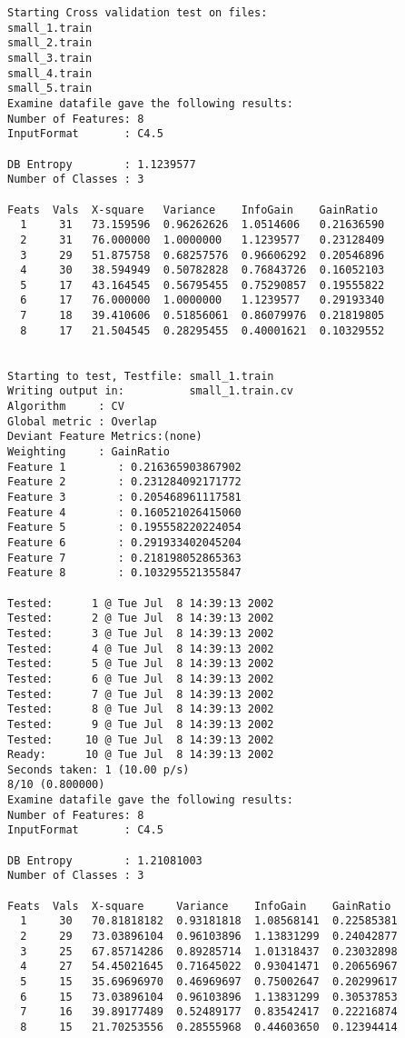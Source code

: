 \begin{verbatim}
Starting Cross validation test on files:
small_1.train
small_2.train
small_3.train
small_4.train
small_5.train
Examine datafile gave the following results:
Number of Features: 8
InputFormat       : C4.5

DB Entropy        : 1.1239577
Number of Classes : 3

Feats  Vals  X-square   Variance    InfoGain    GainRatio
  1     31   73.159596  0.96262626  1.0514606   0.21636590
  2     31   76.000000  1.0000000   1.1239577   0.23128409
  3     29   51.875758  0.68257576  0.96606292  0.20546896
  4     30   38.594949  0.50782828  0.76843726  0.16052103
  5     17   43.164545  0.56795455  0.75290857  0.19555822
  6     17   76.000000  1.0000000   1.1239577   0.29193340
  7     18   39.410606  0.51856061  0.86079976  0.21819805
  8     17   21.504545  0.28295455  0.40001621  0.10329552


Starting to test, Testfile: small_1.train
Writing output in:          small_1.train.cv
Algorithm     : CV
Global metric : Overlap
Deviant Feature Metrics:(none)
Weighting     : GainRatio
Feature 1        : 0.216365903867902
Feature 2        : 0.231284092171772
Feature 3        : 0.205468961117581
Feature 4        : 0.160521026415060
Feature 5        : 0.195558220224054
Feature 6        : 0.291933402045204
Feature 7        : 0.218198052865363
Feature 8        : 0.103295521355847

Tested:      1 @ Tue Jul  8 14:39:13 2002
Tested:      2 @ Tue Jul  8 14:39:13 2002
Tested:      3 @ Tue Jul  8 14:39:13 2002
Tested:      4 @ Tue Jul  8 14:39:13 2002
Tested:      5 @ Tue Jul  8 14:39:13 2002
Tested:      6 @ Tue Jul  8 14:39:13 2002
Tested:      7 @ Tue Jul  8 14:39:13 2002
Tested:      8 @ Tue Jul  8 14:39:13 2002
Tested:      9 @ Tue Jul  8 14:39:13 2002
Tested:     10 @ Tue Jul  8 14:39:13 2002
Ready:      10 @ Tue Jul  8 14:39:13 2002
Seconds taken: 1 (10.00 p/s)
8/10 (0.800000)
Examine datafile gave the following results:
Number of Features: 8
InputFormat       : C4.5

DB Entropy        : 1.21081003
Number of Classes : 3

Feats  Vals  X-square     Variance    InfoGain    GainRatio
  1     30   70.81818182  0.93181818  1.08568141  0.22585381
  2     29   73.03896104  0.96103896  1.13831299  0.24042877
  3     25   67.85714286  0.89285714  1.01318437  0.23032898
  4     27   54.45021645  0.71645022  0.93041471  0.20656967
  5     15   35.69696970  0.46969697  0.75002647  0.20299617
  6     15   73.03896104  0.96103896  1.13831299  0.30537853
  7     16   39.89177489  0.52489177  0.83542417  0.22216874
  8     15   21.70253556  0.28555968  0.44603650  0.12394414



\end{verbatim}
